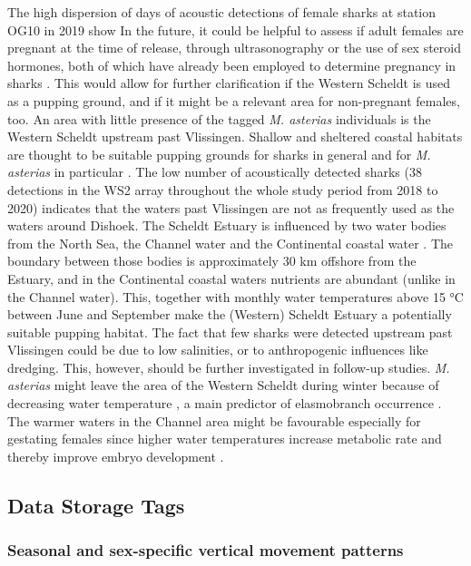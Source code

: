 \documentclass[
  authoryear,
  review,
  3p]{elsarticle}
\begin{document}
The high dispersion of days of acoustic detections of female sharks at
station OG10 in 2019 show In the future, it could be helpful to assess
if adult females are pregnant at the time of release, through
ultrasonography or the use of sex steroid hormones, both of which have
already been employed to determine pregnancy in sharks
\citep{awruch_2014, smukall_2019, anderson_2018, fujinami_2020, fujinami_2021}.
This would allow for further clarification if the Western Scheldt is
used as a pupping ground, and if it might be a relevant area for
non-pregnant females, too. An area with little presence of the tagged
\emph{M. asterias} individuals is the Western Scheldt upstream past
Vlissingen. Shallow and sheltered coastal habitats are thought to be
suitable pupping grounds for sharks in general \citep{speed_2010} and
for \emph{M. asterias} in particular \citep{ellis_2004, ellis_2005}. The
low number of acoustically detected sharks (38 detections in the WS2
array throughout the whole study period from 2018 to 2020) indicates
that the waters past Vlissingen are not as frequently used as the waters
around Dishoek. The Scheldt Estuary is influenced by two water bodies
from the North Sea, the Channel water and the Continental coastal water
\citep[see Section~\ref{sec-mmscheldtBPNS}]{wolff_1973}. The boundary
between those bodies is approximately 30 km offshore from the Estuary,
and in the Continental coastal waters nutrients are abundant (unlike in
the Channel water). This, together with monthly water temperatures above
15 °C between June and September make the (Western) Scheldt Estuary a
potentially suitable pupping habitat. The fact that few sharks were
detected upstream past Vlissingen could be due to low salinities, or to
anthropogenic influences like dredging. This, however, should be further
investigated in follow-up studies. \emph{M. asterias} might leave the
area of the Western Scheldt during winter because of decreasing water
temperature \citep{breve_2016}, a main predictor of elasmobranch
occurrence \citep{martin_2010}. The warmer waters in the Channel area
might be favourable especially for gestating females since higher water
temperatures increase metabolic rate and thereby improve embryo
development \citep{hurst_1999}.

\hypertarget{data-storage-tags}{%
\subsection{Data Storage Tags}\label{data-storage-tags}}

\hypertarget{sec-disc-dst-movementpatterns}{%
\subsubsection{Seasonal and sex-specific vertical movement
patterns}\label{sec-disc-dst-movementpatterns}}
\end{document}
